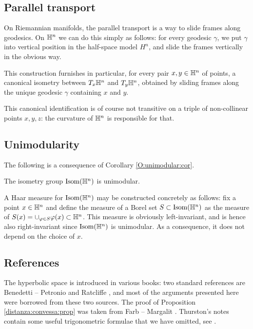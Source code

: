 \subsection{Parallel transport} \label{parallel:subsection}
On Riemannian manifolds, the parallel transport is a way to slide frames along geodesics. On $\mathbb{H}^n$ we can do this simply as follows: for every geodesic $\gamma$, we put $\gamma$ into vertical position in the half-space model $H^n$, and slide the frames vertically in the obvious way.  

This construction furnishes in particular, for every pair $x,y \in \mathbb{H}^n$ of points, a canonical isometry between $T_x\mathbb{H}^n$ and $T_y\mathbb{H}^n$, obtained by sliding frames along the unique geodesic $\gamma$ containing $x$ and $y$.

This canonical identification is of course not transitive on a triple of non-collinear points $x,y,z$: the curvature of $\mathbb{H}^n$ is responsible for that.

\subsection{Unimodularity}
The following is a consequence of Corollary \ref{O:unimodular:cor}.

\begin{cor} \label{unimodular:cor}
The isometry group ${\rm Isom}(\mathbb{H}^n)$ is unimodular.
\end{cor}

\begin{oss} \label{Haar:oss}
A Haar measure for ${\rm Isom}(\mathbb{H}^n)$ may be constructed concretely as follows: fix a point $x\in \mathbb{H}^n$ and define the measure of a Borel set $S\subset {\rm Isom}(\mathbb{H}^n)$ as the measure of $S(x) = \cup_{\varphi\in S} \varphi(x)\subset\mathbb{H}^n$. This measure is obviously left-invariant, and is hence also right-invariant since ${\rm Isom}(\mathbb{H}^n)$ is unimodular. As a consequence, it does not depend on the choice of $x$.
\end{oss}

\subsection{References}
The hyperbolic space is introduced in various books: two standard references are Benedetti -- Petronio \cite{BP} and Ratcliffe \cite{R}, and most of the arguments presented here were borrowed from these two sources. The proof of Proposition \ref{distanza:convessa:prop} was taken from Farb -- Margalit \cite{FM}.
Thurston's notes contain some useful trigonometric formulae that we have omitted, see \cite[Chapter 2]{Th}.


